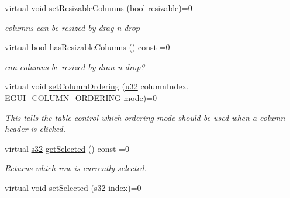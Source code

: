 \begin{DoxyCompactItemize}
\mbox{\label{classirr_1_1gui_1_1IGUITable_a62da949732a2b870ccfb056aefcf823a}} 
virtual void \hyperlink{classirr_1_1gui_1_1IGUITable_a62da949732a2b870ccfb056aefcf823a}{set\+Resizable\+Columns} (bool resizable)=0
\begin{DoxyCompactList}\small\item\em columns can be resized by drag \textquotesingle{}n drop \end{DoxyCompactList}\item 
\mbox{\label{classirr_1_1gui_1_1IGUITable_a6cd99f12740e4fbd9bdc8a431879eec3}} 
virtual bool \hyperlink{classirr_1_1gui_1_1IGUITable_a6cd99f12740e4fbd9bdc8a431879eec3}{has\+Resizable\+Columns} () const =0
\begin{DoxyCompactList}\small\item\em can columns be resized by dran \textquotesingle{}n drop? \end{DoxyCompactList}\item 
virtual void \hyperlink{classirr_1_1gui_1_1IGUITable_a7d0ce2de316fb7f0e6164e8c196a819e}{set\+Column\+Ordering} (\hyperlink{namespaceirr_a0416a53257075833e7002efd0a18e804}{u32} column\+Index, \hyperlink{namespaceirr_1_1gui_a551e22458ae01a7eeaf87c0fbaaabf9a}{E\+G\+U\+I\+\_\+\+C\+O\+L\+U\+M\+N\+\_\+\+O\+R\+D\+E\+R\+I\+NG} mode)=0
\begin{DoxyCompactList}\small\item\em This tells the table control which ordering mode should be used when a column header is clicked. \end{DoxyCompactList}\item 
\mbox{\label{classirr_1_1gui_1_1IGUITable_acbad4aeda4e0135192a29fb93c19c67c}} 
virtual \hyperlink{namespaceirr_ac66849b7a6ed16e30ebede579f9b47c6}{s32} \hyperlink{classirr_1_1gui_1_1IGUITable_acbad4aeda4e0135192a29fb93c19c67c}{get\+Selected} () const =0
\begin{DoxyCompactList}\small\item\em Returns which row is currently selected. \end{DoxyCompactList}\item 
\mbox{\label{classirr_1_1gui_1_1IGUITable_ab5b51e160ca739ab7f3503c5d8897184}} 
virtual void \hyperlink{classirr_1_1gui_1_1IGUITable_ab5b51e160ca739ab7f3503c5d8897184}{set\+Selected} (\hyperlink{namespaceirr_ac66849b7a6ed16e30ebede579f9b47c6}{s32} index)=0

\end{DoxyCompactItemize}
